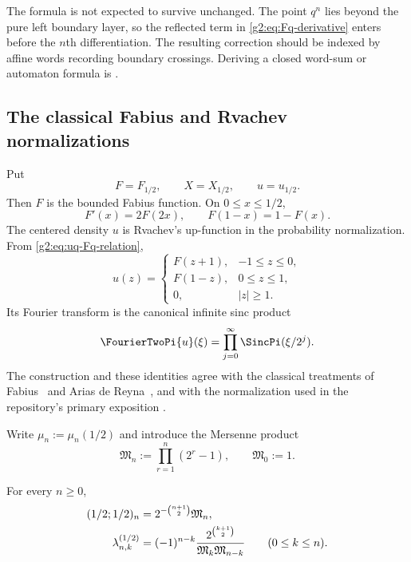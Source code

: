 \begin{remark}
The formula is not expected to survive unchanged.  The point $q^n$ lies beyond
the pure left boundary layer, so the reflected term in
\eqref{g2:eq:Fq-derivative} enters before the $n$th differentiation.  The
resulting correction should be indexed by affine words recording boundary
crossings.  Deriving a closed word-sum or automaton formula is
.
\end{remark}

\subsection{The classical Fabius and Rvachev normalizations}

Put
\[
 F=F_{1/2},\qquad X=X_{1/2},\qquad u=u_{1/2}.
\]
Then $F$ is the bounded Fabius function.  On $0\le x\le1/2$,
\[
 F'(x)=2F(2x),
 \qquad
 F(1-x)=1-F(x).
\]
The centered density $u$ is Rvachev's up-function in the probability
normalization.  From \eqref{g2:eq:uq-Fq-relation},
\begin{equation}
 u(z)=
 \begin{cases}
 F(z+1),&-1\le z\le0,\\
 F(1-z),&0\le z\le1,\\
 0,&|z|\ge1.
 \end{cases}
 \label{g2:eq:up-Fabius-piecewise}
\end{equation}
Its Fourier transform is the canonical infinite sinc product
\begin{equation}
 \FourierTwoPi{u}(\xi)=\prod_{j=0}^\infty\SincPi(\xi/2^j).
 \label{g2:eq:up-fourier-classical}
\end{equation}
The construction and these identities agree with the classical treatments of
Fabius~\cite{Fabius1966} and Arias de Reyna~\cite{Arias2017Definition}, and
with the normalization used in the repository's primary exposition
\cite{ProveItFabius}.

Write $\mu_n:=\mu_n(1/2)$ and introduce the Mersenne product
\begin{equation}
 \mathfrak M_n:=\prod_{r=1}^n(2^r-1),
 \qquad \mathfrak M_0:=1.
 \label{g2:eq:mersenne-definition}
\end{equation}

\begin{proposition}
\label{g2:prop:dyadic-mersenne-row}
For every $n\ge0$,
\begin{align}
 (1/2;1/2)_n
 &=2^{-\binom{n+1}{2}}\mathfrak M_n,
 \label{g2:eq:qpoch-mersenne}\\
 \lambda_{n,k}^{(1/2)}
 &=(-1)^{n-k}{2^{\binom{k+1}{2}}
 \over\mathfrak M_k\mathfrak M_{n-k}}
 \qquad(0\le k\le n).
 \label{g2:eq:dyadic-lambda-mersenne}
\end{align}
\end{proposition}

